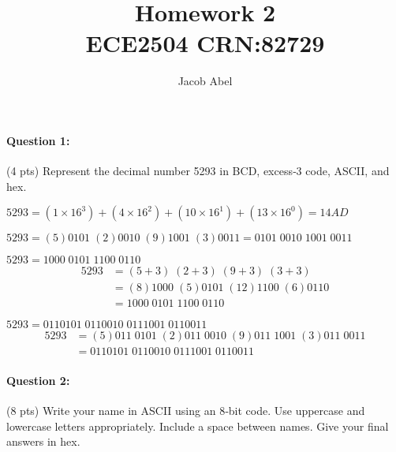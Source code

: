 \documentclass[12pt,letterpaper,notitlepage]{report}
\author{Jacob Abel}
\title{%
	Homework 2
	\\\large ECE2504 CRN:82729
}
\begin{document}
\maketitle
\paragraph{Question 1:}
(4 pts) Represent the decimal number 5293 in BCD, excess‐3 code, ASCII, and hex.
\begin{description}[noitemsep]
\item[Hex:] $5293 = (1\times16^3)+(4\times16^2)+(10\times16^1)+(13\times16^0) = 14AD$
\item[BCD:] $5293 = (5)0101 \;(2)0010 \;(9)1001 \;(3)0011 = 0101 \;0010\; 1001\; 0011$
\item[Excess-3:] $5293 = 1000\; 0101\; 1100 \;0110$
\begin{align*}
5293 &= (5+3)\; (2+3) \;(9+3)\; (3+3) \\
	  &= (8)1000\; (5)0101 \;(12)1100\; (6)0110 \\
	  &= 1000 \;0101 \;1100\; 0110
\end{align*}
\item[ASCII:] $5293=0110101 \;0110010 \;0111001 \;0110011$
\begin{align*}
5293 &= (5)011\;0101 \;(2)011\;0010 \;(9)011\;1001 \;(3)011\;0011\\ 
	 &= 0110101\; 0110010 \;0111001 \;0110011
\end{align*}
\end{description}

\paragraph{Question 2:}
(8 pts) Write your name in ASCII using an 8‐bit code. Use uppercase and lowercase letters appropriately. Include a space between names. Give your final answers in hex.
\end{document}
